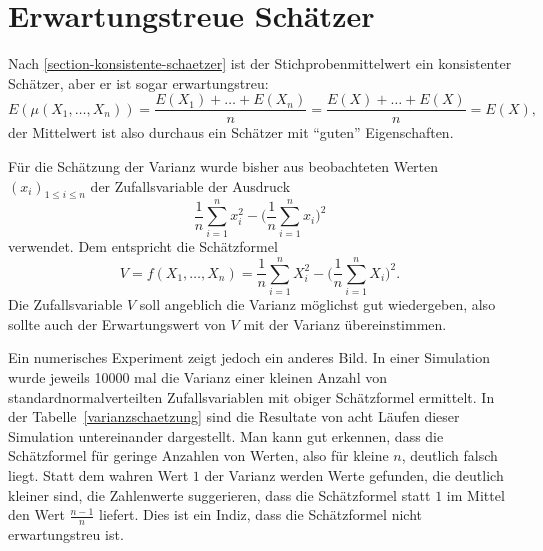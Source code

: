 \section{Erwartungstreue Schätzer}
\label{section-erwartungstreue-schaetzer}
Nach \ref{section-konsistente-schaetzer} ist der Stichprobenmittelwert
ein konsistenter Schätzer,
aber er ist sogar erwartungstreu:
\[
E(\mu(X_1,\dots,X_n))=\frac{E(X_1)+\dots+E(X_n)}{n}=\frac{E(X)+\dots+E(X)}{n}
=E(X),
\]
der Mittelwert ist also durchaus ein Schätzer mit ``guten'' Eigenschaften.

Für die Schätzung der Varianz wurde bisher aus beobachteten Werten
$(x_i)_{1\le i\le n}$ der Zufallsvariable der Ausdruck
\begin{equation}
\frac1n\sum_{i=1}^n x_i^2-\biggl(\frac1n\sum_{i=1}^nx_i\biggr)^2
\end{equation}
verwendet.
Dem entspricht die Schätzformel
\begin{equation}
V=f(X_1,\dots,X_n)=\frac1n\sum_{i=1}^nX_i^2-\biggl(\frac1n\sum_{i=1}^nX_i\biggr)^2.
\label{schaetzer-sstern}
\end{equation}
Die Zufallsvariable $V$ soll angeblich die Varianz möglichst gut
wiedergeben, also sollte auch der Erwartungswert von $V$ mit der Varianz
übereinstimmen.

Ein numerisches Experiment zeigt jedoch ein anderes Bild.
In einer
Simulation wurde jeweils 10000 mal die Varianz einer kleinen Anzahl von
standardnormalverteilten Zufallsvariablen mit obiger Schätzformel ermittelt.
In der Tabelle~\ref{varianzschaetzung} sind die Resultate von acht
Läufen dieser Simulation untereinander dargestellt.
Man kann gut erkennen, 
dass die Schätzformel für geringe Anzahlen von Werten, also für kleine
$n$, deutlich falsch liegt.
Statt dem wahren Wert $1$ der Varianz
werden Werte gefunden, die deutlich kleiner sind, die Zahlenwerte
suggerieren, dass die Schätzformel statt $1$ im Mittel den Wert
$\frac{n-1}n$ liefert.
Dies ist ein Indiz, dass die Schätzformel nicht
erwartungstreu ist.

